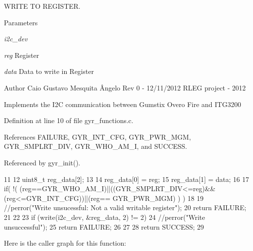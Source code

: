 WRITE TO REGISTER. 


\begin{DoxyParams}{Parameters}
\item[{\em i2c\_\-dev}]\item[{\em reg}]Register \item[{\em data}]Data to write in Register\end{DoxyParams}
\begin{DoxyAuthor}{Author}
Caio Gustavo Mesquita Ângelo Rev 0 -\/ 12/11/2012 RLEG project -\/ 2012
\end{DoxyAuthor}
Implements the I2C communication between Gumstix Overo Fire and ITG3200 

Definition at line 10 of file gyr\_\-functions.c.



References FAILURE, GYR\_\-INT\_\-CFG, GYR\_\-PWR\_\-MGM, GYR\_\-SMPLRT\_\-DIV, GYR\_\-WHO\_\-AM\_\-I, and SUCCESS.



Referenced by gyr\_\-init().




\begin{DoxyCode}
11 {
12   uint8_t reg_data[2];
13 
14   reg_data[0] = reg;
15   reg_data[1] = data;
16 
17   if( !( (reg==GYR_WHO_AM_I)||((GYR_SMPLRT_DIV<=reg)&&(reg<=GYR_INT_CFG))||(reg==
      GYR_PWR_MGM) ) )
18   {
19       //perror("Write unsucessful: Not a valid writable register");
20       return FAILURE;
21   }
22         
23   if (write(i2c_dev, &reg_data, 2) != 2) {               
24           //perror("Write unsuccessful");
25           return FAILURE;
26   }
27 
28   return SUCCESS;
29 }
\end{DoxyCode}




Here is the caller graph for this function:

